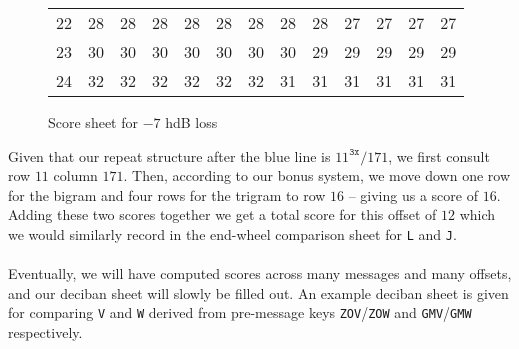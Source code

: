 \begin{figure}[H]
\begin{center}
{\begin{tabular}{r|rrrrrrrrrrrr}
          22 & 28  & 28  & 28  & 28  & 28  & 28  & 28  & 28  & 27  &
          27 & 27  & 27                                                  \\
          23 & 30  & 30  & 30  & 30  & 30  & 30  & 30  & 29  & 29  &
          29 & 29  & 29                                                  \\
          24 & 32  & 32  & 32  & 32  & 32  & 32  & 31  & 31  & 31  &
          31 & 31  & 31                                                  \\
      \end{tabular}}
    \end{center}
    \caption{Score sheet for $-7$ hdB loss}
  \end{figure}
  \noindent Given that our repeat structure after the blue line is
  $11^\texttt{3x}/171$, we first consult row $11$ column $171$. Then,
  according to our bonus system, we move down one row for the bigram
  and four rows for the trigram to row $16$ -- giving us a score of
  $16$. Adding these two scores together we get a total score for
  this offset of $12$ which we would similarly record in the
  end-wheel comparison sheet for \texttt{L} and \texttt{J}.
  \\\\Eventually, we will have computed scores across many messages
  and many offsets, and our deciban sheet will slowly be filled
  out. An example deciban sheet is given for comparing \texttt{V}
  and \texttt{W} derived from pre-message keys
  \texttt{ZOV}/\texttt{ZOW} and \texttt{GMV}/\texttt{GMW} respectively.
